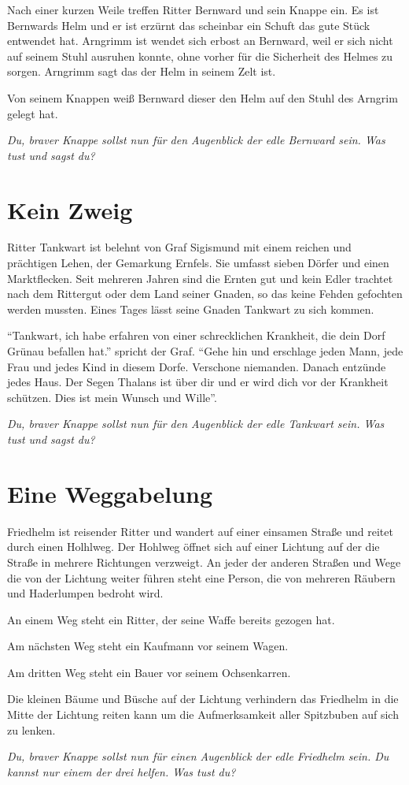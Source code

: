 \documentclass[twocolumn, pdftex, 12pt]{book}
\begin{document}
Nach einer kurzen Weile treffen Ritter Bernward und sein Knappe ein.
Es ist Bernwards Helm und er ist erzürnt das scheinbar ein Schuft das gute
Stück entwendet hat. Arngrimm ist wendet sich erbost an Bernward, weil er sich
nicht auf seinem Stuhl ausruhen konnte, ohne vorher für die Sicherheit des
Helmes zu sorgen. Arngrimm sagt das der Helm in seinem Zelt ist.

Von seinem Knappen weiß Bernward dieser den Helm auf den Stuhl des Arngrim
gelegt hat.

\emph{Du, braver Knappe sollst nun für den Augenblick der edle Bernward sein. Was
tust und sagst du?}

\chapter{Kein Zweig}

Ritter Tankwart ist belehnt von Graf Sigismund mit einem reichen und prächtigen
Lehen, der Gemarkung Ernfels. Sie umfasst sieben Dörfer und einen Marktflecken.
Seit mehreren Jahren sind die Ernten gut und kein Edler trachtet nach dem
Rittergut oder dem Land seiner Gnaden, so das keine Fehden gefochten werden
mussten. Eines Tages lässt seine Gnaden Tankwart zu sich kommen.

``Tankwart, ich habe erfahren von einer schrecklichen Krankheit, die dein Dorf
Grünau befallen hat.'' spricht der Graf. ``Gehe hin und erschlage jeden Mann,
jede Frau und jedes Kind in diesem Dorfe. Verschone niemanden. Danach
entzünde jedes Haus. Der Segen Thalans ist über dir und er wird dich vor der
Krankheit schützen. Dies ist mein Wunsch und Wille''.

\emph{Du, braver Knappe sollst nun für den Augenblick der edle Tankwart sein.
Was tust und sagst du?}

\chapter{Eine Weggabelung}

Friedhelm ist reisender Ritter und wandert auf einer einsamen Straße und reitet
durch einen Holhlweg. Der Hohlweg öffnet sich auf einer Lichtung auf der die
Straße in mehrere Richtungen verzweigt. An jeder der anderen Straßen und Wege
die von der Lichtung weiter führen steht eine Person, die von mehreren Räubern
und Haderlumpen bedroht wird. 

An einem Weg steht ein Ritter, der seine Waffe bereits gezogen hat.

Am nächsten Weg steht ein Kaufmann vor seinem Wagen.

Am dritten Weg steht ein Bauer vor seinem Ochsenkarren.

Die kleinen Bäume und Büsche auf der Lichtung verhindern das Friedhelm in die
Mitte der Lichtung reiten kann um die Aufmerksamkeit aller Spitzbuben auf sich
zu lenken. 

\emph{Du, braver Knappe sollst nun für einen Augenblick der edle Friedhelm
sein. Du kannst nur einem der drei helfen. Was tust du?}
\end{document}

